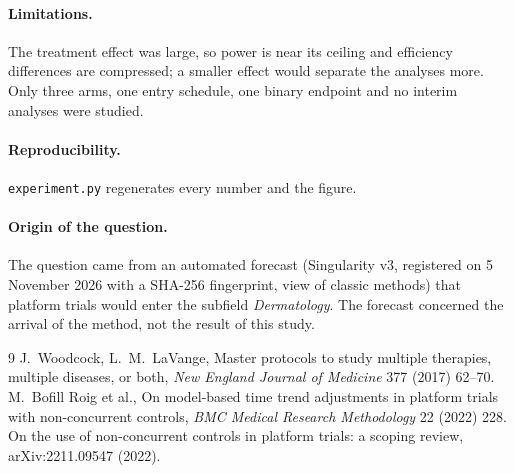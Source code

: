 \documentclass[11pt]{article}
\begin{document}
\paragraph{Limitations.} The treatment effect was large, so power is near its ceiling and efficiency differences are
compressed; a smaller effect would separate the analyses more. Only three arms, one entry schedule, one binary
endpoint and no interim analyses were studied.

\paragraph{Reproducibility.} \texttt{experiment.py} regenerates every number and the figure.

\paragraph{Origin of the question.} The question came from an automated forecast (Singularity v3, registered on 5
November 2026 with a SHA-256 fingerprint, view of classic methods) that platform trials would enter the subfield
\emph{Dermatology}. The forecast concerned the arrival of the method, not the result of this study.

\begin{thebibliography}{9}
 J.~Woodcock, L.~M.~LaVange, Master protocols to study multiple therapies, multiple diseases, or
both, \emph{New England Journal of Medicine} 377 (2017) 62--70.
 M.~Bofill Roig et al., On model-based time trend adjustments in platform trials with
non-concurrent controls, \emph{BMC Medical Research Methodology} 22 (2022) 228.
 On the use of non-concurrent controls in platform trials: a scoping review, arXiv:2211.09547 (2022).
\end{thebibliography}
\end{document}
